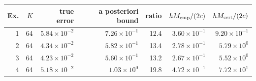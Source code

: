 \begin{tabular}{rrrrrrr}
\toprule
Ex. & $K$ & true error & a posteriori bound & ratio & $hM_{\rm emp}/(2c)$ & $hM_{\rm cert}/(2c)$\\
\midrule
1 & 64 & $5.84\times10^{-2}$ & $7.26\times10^{-1}$ & 12.4 & $3.60\times10^{-1}$ & $9.20\times10^{-1}$\\
2 & 64 & $4.34\times10^{-2}$ & $5.82\times10^{-1}$ & 13.4 & $2.78\times10^{-1}$ & $5.79\times10^{0}$\\
3 & 64 & $4.23\times10^{-2}$ & $5.60\times10^{-1}$ & 13.2 & $2.67\times10^{-1}$ & $5.52\times10^{0}$\\
4 & 64 & $5.18\times10^{-2}$ & $1.03\times10^{0}$ & 19.8 & $4.72\times10^{-1}$ & $7.72\times10^{1}$\\
\bottomrule
\end{tabular}